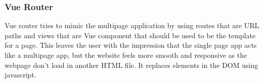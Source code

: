 \subsubsection{Vue Router}
Vue router tries to mimic the multipage application by using routes that are URL paths and views that are Vue component that should be used to be the template for a page. This leaves the user with the impression that the single page app acts like a multipage app, but the website feels more smooth and responsive as the webpage don't load in another HTML file. It replaces elements in the DOM using javascript.